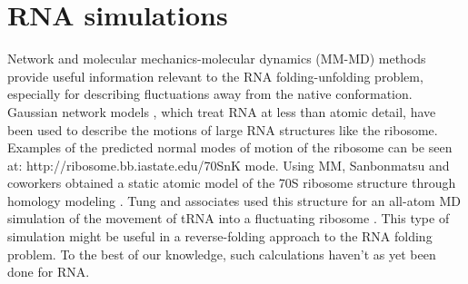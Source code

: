 \section{RNA simulations}
Network  and molecular  mechanics-molecular  dynamics (MM-MD)  methods
provide  useful  information  relevant  to the  RNA  folding-unfolding
problem, especially  for describing fluctuations away  from the native
conformation.   Gaussian network  models  \cite{y_wang2004, bahar1998,
  wang2005}, which  treat RNA  at less than  atomic detail,  have been
used  to  describe  the  motions  of large  RNA  structures  like  the
ribosome.  Examples  of the  predicted normal modes  of motion  of the
ribosome  can be  seen at:  http://ribosome.bb.iastate.edu/70SnK mode.
Using MM, Sanbonmatsu and coworkers  obtained a static atomic model of
the    70S    ribosome    structure    through    homology    modeling
\cite{tung2004}.  Tung  and  associates  used this  structure  for  an
all-atom  MD simulation  of the  movement of  tRNA into  a fluctuating
ribosome  \cite{sanbonmatsu2005}.  This  type of  simulation  might be
useful in a  reverse-folding approach to the RNA  folding problem.  To
the best of our knowledge,  such calculations haven't as yet been done
for RNA.

